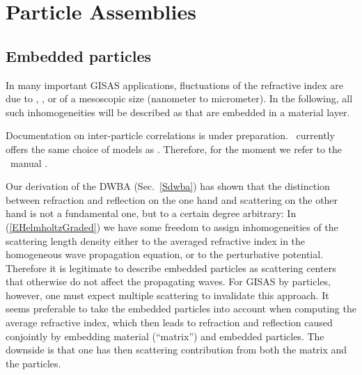

\chapter{Particle Assemblies}  \label{sec:Assemblies}


\section{Embedded particles}

%
%
%
In many important GISAS applications,
fluctuations of the refractive index are due to
, ,  or 
%
%
%
%
of a mesoscopic size (nanometer to micrometer).
In the following, all such inhomogeneities will be described as
 that are embedded in a material layer.

\Work
{Documentation on inter-particle correlations is under preparation.
\BornAgain\ currently offers the same choice of models as \IsGISAXS.
Therefore, for the moment we refer to the \IsGISAXS\ manual \cite{Laz08}.}

\iffalse
Our derivation of the DWBA (Sec.~\ref{Sdwba}) has shown
that the distinction between refraction and reflection on the one hand
and scattering on the other hand is not a fundamental one,
but to a certain degree arbitrary:
In (\ref{EHelmholtzGraded}) we have some freedom to assign
inhomogeneities of the scattering length density
either to the averaged refractive index in the
homogeneous wave propagation equation,
or to the perturbative potential.
Therefore it is legitimate
to describe  embedded particles
as scattering centers that otherwise do not affect the propagating waves.
For GISAS by  particles, however,
one must expect multiple scattering to invalidate this approach.
It seems preferable to take the embedded particles into account
when computing the average refractive index,
which then leads to refraction and reflection caused conjointly
by embedding material (``matrix'') and embedded particles.
%
The downside is that one has then scattering contribution
from both the matrix and the particles.

